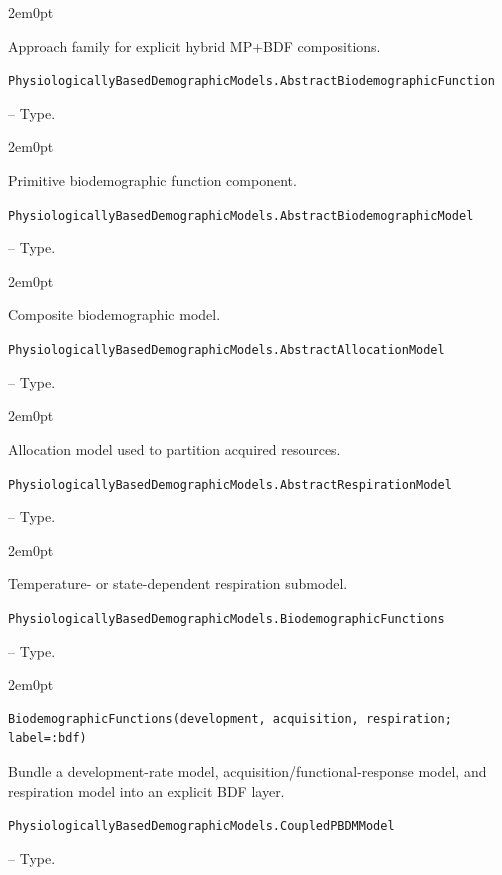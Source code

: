 \begin{adjustwidth}{2em}{0pt}

Approach family for explicit hybrid MP+BDF compositions.



\end{adjustwidth}
\hypertarget{9967090399205207647}{\texttt{PhysiologicallyBasedDemographicModels.AbstractBiodemographicFunction}}  -- {Type.}

\begin{adjustwidth}{2em}{0pt}

Primitive biodemographic function component.



\end{adjustwidth}
\hypertarget{1173717946360482213}{\texttt{PhysiologicallyBasedDemographicModels.AbstractBiodemographicModel}}  -- {Type.}

\begin{adjustwidth}{2em}{0pt}

Composite biodemographic model.



\end{adjustwidth}
\hypertarget{15298171894100876649}{\texttt{PhysiologicallyBasedDemographicModels.AbstractAllocationModel}}  -- {Type.}

\begin{adjustwidth}{2em}{0pt}

Allocation model used to partition acquired resources.



\end{adjustwidth}
\hypertarget{8717631907583731991}{\texttt{PhysiologicallyBasedDemographicModels.AbstractRespirationModel}}  -- {Type.}

\begin{adjustwidth}{2em}{0pt}

Temperature- or state-dependent respiration submodel.



\end{adjustwidth}
\hypertarget{13271374260718923528}{\texttt{PhysiologicallyBasedDemographicModels.BiodemographicFunctions}}  -- {Type.}

\begin{adjustwidth}{2em}{0pt}


\begin{verbatim}
BiodemographicFunctions(development, acquisition, respiration; label=:bdf)
\end{verbatim}

Bundle a development-rate model, acquisition/functional-response model, and respiration model into an explicit BDF layer.



\end{adjustwidth}
\hypertarget{10513505543102158353}{\texttt{PhysiologicallyBasedDemographicModels.CoupledPBDMModel}}  -- {Type.}

